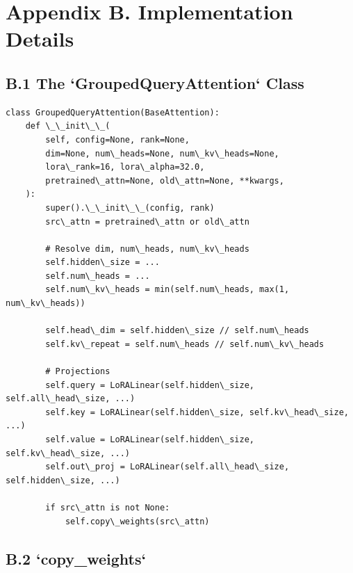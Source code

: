 
\section{Appendix B. Implementation Details}

\subsection{B.1 The `GroupedQueryAttention` Class}

\begin{lstlisting}
class GroupedQueryAttention(BaseAttention):
    def \_\_init\_\_(
        self, config=None, rank=None,
        dim=None, num\_heads=None, num\_kv\_heads=None,
        lora\_rank=16, lora\_alpha=32.0,
        pretrained\_attn=None, old\_attn=None, **kwargs,
    ):
        super().\_\_init\_\_(config, rank)
        src\_attn = pretrained\_attn or old\_attn
        
        # Resolve dim, num\_heads, num\_kv\_heads
        self.hidden\_size = ...
        self.num\_heads = ...
        self.num\_kv\_heads = min(self.num\_heads, max(1, num\_kv\_heads))
        
        self.head\_dim = self.hidden\_size // self.num\_heads
        self.kv\_repeat = self.num\_heads // self.num\_kv\_heads
        
        # Projections
        self.query = LoRALinear(self.hidden\_size, self.all\_head\_size, ...)
        self.key = LoRALinear(self.hidden\_size, self.kv\_head\_size, ...)
        self.value = LoRALinear(self.hidden\_size, self.kv\_head\_size, ...)
        self.out\_proj = LoRALinear(self.all\_head\_size, self.hidden\_size, ...)
        
        if src\_attn is not None:
            self.copy\_weights(src\_attn)
\end{lstlisting}

\subsection{B.2 `copy\_weights`}

